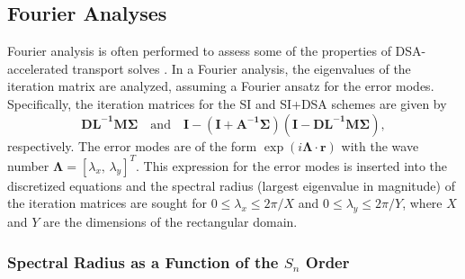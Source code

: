 \documentclass[preprint,10pt]{elsarticle}
\newcommand\bs{\boldsymbol}
\renewcommand{\(}{\left(}
\renewcommand{\)}{\right)}
\renewcommand{\[}{\left[}
\renewcommand{\]}{\right]}
\begin{document}
\subsection{Fourier Analyses}

Fourier analysis is often performed to assess some of the properties of 
DSA-accelerated transport solves \cite{dsa_ref,larsen_dsa,consistent_p1}. In a Fourier analysis,
the eigenvalues of the iteration matrix are analyzed, assuming a Fourier ansatz for the 
error modes. Specifically, the iteration matrices for the SI and SI+DSA schemes are given by
\begin{equation}
\bs{D L^{-1}M \Sigma} \quad \text{and} \quad \bs{I}-\bs{(I+A^{-1}\Sigma)(I-D L^{-1}M \Sigma)},
\end{equation}
respectively.  The error modes are of the form $\exp(i \bs{\Lambda} \cdot \bs{r})$ with the
wave number $\bs{\Lambda}=[\lambda_x,\, \lambda_y]^T$. This expression for the error modes 
is inserted into the discretized equations and the spectral radius (largest eigenvalue in magnitude)
of the iteration matrices are sought for $0 \le \lambda_x \le 2\pi/X$ and $0 \le \lambda_y \le 2\pi/Y$,
where $X$ and $Y$ are the dimensions of the rectangular domain.


\subsubsection{Spectral Radius as a Function of the $S_n$ Order}
\end{document}
